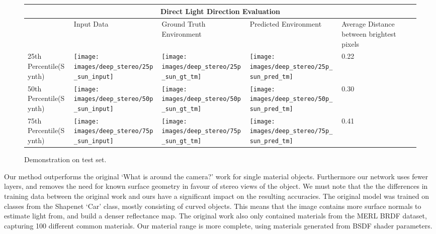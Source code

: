 \documentclass[ %
                    author={Gavin Parker},
                supervisor={Dr. Neill Campbell},
                    degree={MEng},
                     title={Deep Learning for Illumination Estimation from Stereo Images},
                  subtitle={},
                      type={Research},
                      year={2018} ]{dissertation}
\begin{document}
 \begin{figure}[H]
\centering
\begin{tabular}{ |p{3cm}||p{3cm}|p{3cm}|p{3cm}|p{3cm}|  }
 \hline
 \multicolumn{5}{|c|}{Direct Light Direction Evaluation} \\
 \hline
  & Input Data &Ground Truth Environment&Predicted Environment&Average Distance between brightest pixels\\
 \hline
 25th Percentile(Synth)&\parbox[c]{1em}{
 \texttt{[image: images/deep\_stereo/25p\_sun\_input]}}&\parbox[c]{1em}{\texttt{[image: images/deep\_stereo/25p\_sun\_gt\_tm]}}&
\parbox[c]{1em}{\texttt{[image: images/deep\_stereo/25p\_sun\_pred\_tm]}}& 0.22\\
 50th Percentile(Synth)&\parbox[c]{1em}{
 \texttt{[image: images/deep\_stereo/50p\_sun\_input]}}&\parbox[c]{1em}{\texttt{[image: images/deep\_stereo/50p\_sun\_gt\_tm]}}&
\parbox[c]{1em}{\texttt{[image: images/deep\_stereo/50p\_sun\_pred\_tm]}}& 0.30\\
 75th Percentile(Synth)&\parbox[c]{1em}{
 \texttt{[image: images/deep\_stereo/75p\_sun\_input]}}&\parbox[c]{1em}{\texttt{[image: images/deep\_stereo/75p\_sun\_gt\_tm]}}&
\parbox[c]{1em}{\texttt{[image: images/deep\_stereo/75p\_sun\_pred\_tm]}}& 0.41\\
 \hline
\end{tabular}

\caption{Demonstration on test set.}
\label{tab:sun_results}

\end{figure}
Our method outperforms the original `What is around the camera?' work for single material objects. Furthermore our network uses fewer layers, and removes the need for known surface geometry in favour of stereo views of the object. We must note that the the differences in training data between the original work and ours have a significant impact on the resulting accuracies. The original model was trained on classes from the Shapenet `Car' class, mostly consisting of curved objects. This means that the image contains more surface normals to estimate light from, and build a denser reflectance map. The original work also only contained materials from the MERL BRDF dataset, capturing 100 different common materials. Our material range is more complete, using materials generated from BSDF shader parameters.
\end{document}
